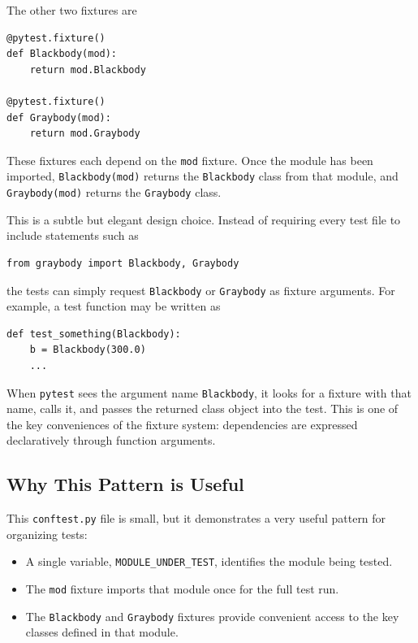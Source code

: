 The other two fixtures are

\begin{verbatim}
@pytest.fixture()
def Blackbody(mod):
    return mod.Blackbody

@pytest.fixture()
def Graybody(mod):
    return mod.Graybody
\end{verbatim}

These fixtures each depend on the \texttt{mod} fixture. Once the module has been imported, \texttt{Blackbody(mod)} returns the \texttt{Blackbody} class from that module, and \texttt{Graybody(mod)} returns the \texttt{Graybody} class.

This is a subtle but elegant design choice. Instead of requiring every test file to include statements such as

\begin{verbatim}
from graybody import Blackbody, Graybody
\end{verbatim}

the tests can simply request \texttt{Blackbody} or \texttt{Graybody} as fixture arguments. For example, a test function may be written as

\begin{verbatim}
def test_something(Blackbody):
    b = Blackbody(300.0)
    ...
\end{verbatim}

When \texttt{pytest} sees the argument name \texttt{Blackbody}, it looks for a fixture with that name, calls it, and passes the returned class object into the test. This is one of the key conveniences of the fixture system: dependencies are expressed declaratively through function arguments.

\subsection{Why This Pattern is Useful}

This \texttt{conftest.py} file is small, but it demonstrates a very useful pattern for organizing tests:

\begin{itemize}
\item A single variable, \texttt{MODULE\_UNDER\_TEST}, identifies the module being tested.
\item The \texttt{mod} fixture imports that module once for the full test run.
\item The \texttt{Blackbody} and \texttt{Graybody} fixtures provide convenient access to the key classes defined in that module.
\end{itemize}

